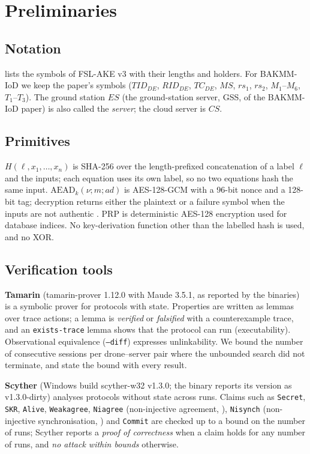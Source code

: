\section{Preliminaries}\label{sec:prelim}

\subsection{Notation}
 lists the symbols of FSL-AKE v3 with their lengths and holders. For BAKMM-IoD we keep the paper's symbols
($TID_{DE}$, $RID_{DE}$, $TC_{DE}$, $MS$, $rs_1$, $rs_2$, $M_1$--$M_6$, $T_1$--$T_3$). The ground station $ES$ (the
ground-station server, GSS, of the BAKMM-IoD paper) is also called the \emph{server}; the cloud server is $CS$.


\subsection{Primitives}
$H(\ell, x_1,\dots,x_n)$ is SHA-256 \citep{fips1804} over the length-prefixed concatenation of a label $\ell$ and the inputs;
each equation uses its own label, so no two equations hash the same input. $\mathrm{AEAD}_k(\nu; m; ad)$ is AES-128-GCM
\citep{nist80038d} with a 96-bit nonce and a 128-bit tag; decryption returns either the plaintext or a failure symbol when the
inputs are not authentic \citep{rfc5116}. $\mathrm{PRP}$ is deterministic AES-128 encryption used for database indices. No key-derivation function other
than the labelled hash is used, and no XOR.

\subsection{Verification tools}
\textbf{Tamarin} \citep{meier2013} (tamarin-prover 1.12.0 with Maude 3.5.1, as reported by the binaries) is a
symbolic prover for protocols with state. Properties are written as lemmas over trace actions; a lemma is \emph{verified} or
\emph{falsified} with a counterexample trace, and an \texttt{exists-trace} lemma shows that the protocol can run
(executability). Observational equivalence (\texttt{--diff}) \citep{basin2015} expresses unlinkability. We bound the number of consecutive sessions per drone--server pair where the unbounded search did not
terminate, and state the bound with every result.

\textbf{Scyther} \citep{cremers2008} (Windows build scyther-w32 v1.3.0; the binary reports its version as
v1.3.0-dirty) analyses protocols without state across runs. Claims such as \texttt{Secret}, \texttt{SKR},
\texttt{Alive}, \texttt{Weakagree}, \texttt{Niagree} (non-injective agreement, \citealp{lowe1997}), \texttt{Nisynch}
(non-injective synchronisation, \citealp{cremers2006}) and \texttt{Commit} are checked up to a bound on the number of runs; Scyther reports a \emph{proof of correctness} when a claim holds for any number of runs, and
\emph{no attack within bounds} otherwise.


